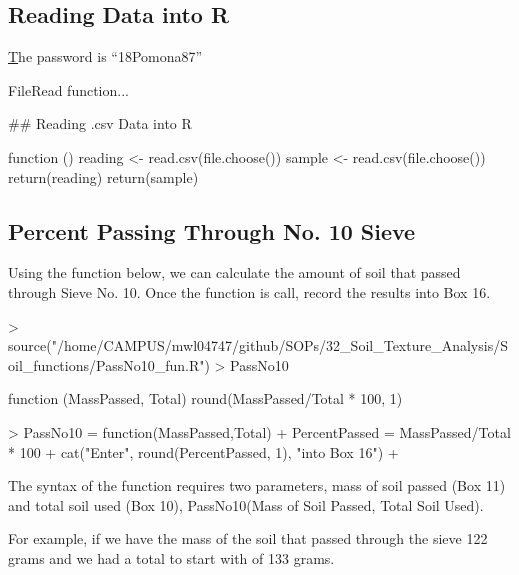
\subsection{Reading Data into R}

\href{http://thinkertools.org/grainsize/} 

The password is ``18Pomona87''

FileRead function...




## Reading .csv Data into R
\begin{Schunk}
\begin{Soutput}
function () 
{
    reading <- read.csv(file.choose())
    sample <- read.csv(file.choose())
    return(reading)
    return(sample)
}
\end{Soutput}
\end{Schunk}


\subsection{Percent Passing Through No. 10 Sieve}

Using the function below, we can calculate the amount of soil that passed through Sieve No. 10. Once the function is call, record the results into Box 16. 

\begin{Schunk}
\begin{Sinput}
> source("/home/CAMPUS/mwl04747/github/SOPs/32_Soil_Texture_Analysis/Soil_functions/PassNo10_fun.R")
> PassNo10
\end{Sinput}
\begin{Soutput}
function (MassPassed, Total) 
{
    round(MassPassed/Total * 100, 1)
}
\end{Soutput}
\end{Schunk}

\begin{Schunk}
\begin{Sinput}
> PassNo10 = function(MassPassed,Total){
+   PercentPassed = MassPassed/Total * 100
+   cat("Enter", round(PercentPassed, 1), "into Box 16")
+ }
\end{Sinput}
\end{Schunk}

The syntax of the function requires two parameters, mass of soil passed (Box 11) and total soil used (Box 10), PassNo10(Mass of Soil Passed, Total Soil Used). 

For example, if we have the mass of the soil that passed through the sieve 122 grams and we had a total to start with of 133 grams.

